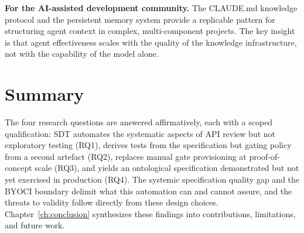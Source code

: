 \textbf{For the AI-assisted development community.} The CLAUDE.md knowledge protocol and the persistent memory system provide a replicable pattern for structuring agent context in complex, multi-component projects. The key insight is that agent effectiveness scales with the quality of the knowledge infrastructure, not with the capability of the model alone.

\section{Summary}
\label{sec:discussion-summary}

The four research questions are answered affirmatively, each with a scoped qualification: SDT automates the systematic aspects of API review but not exploratory testing (RQ1), derives tests from the specification but gating policy from a second artefact (RQ2), replaces manual gate provisioning at proof-of-concept scale (RQ3), and yields an ontological specification demonstrated but not yet exercised in production (RQ4). The systemic specification quality gap and the BYOCI boundary delimit what this automation can and cannot assure, and the threats to validity follow directly from these design choices. Chapter~\ref{ch:conclusion} synthesizes these findings into contributions, limitations, and future work.

